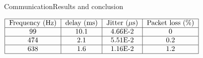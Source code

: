 \begin{frame}{Communication}{Results and conclusion}
\begin{center}
  $\begin{tabular}{|c|c|c|c|c|}
    \hline
    \text{Frequency (Hz)} & \text{delay (ms)} & \text{Jitter ($\mu$s)} & \text{Packet loss (\%)}\\
    \hline
    99 & 10.1 & 4.66E-2 & 0 \\
    \hline
    474 & 2.1 & 5.51E-2 & 0.2 \\
    \hline
    638 & 1.6 & 1.16E-2 & 1.2 \\
    \hline
  \end{tabular}$
  \label{tab:new_protocol}
\end{center}

\end{frame}


